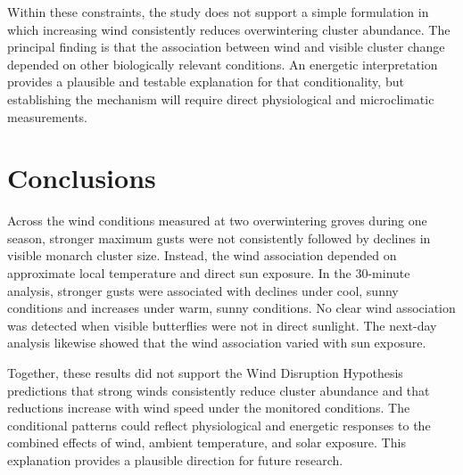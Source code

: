\documentclass[insects,article,submit,pdftex,moreauthors]{Definitions/mdpi}
\begin{document}
Within these constraints, the study does not support a simple formulation in which increasing wind consistently reduces overwintering cluster abundance. The principal finding is that the association between wind and visible cluster change depended on other biologically relevant conditions. An energetic interpretation provides a plausible and testable explanation for that conditionality, but establishing the mechanism will require direct physiological and microclimatic measurements.


\section{Conclusions}

Across the wind conditions measured at two overwintering groves during one season, stronger maximum gusts were not consistently followed by declines in visible monarch cluster size. Instead, the wind association depended on approximate local temperature and direct sun exposure. In the 30-minute analysis, stronger gusts were associated with declines under cool, sunny conditions and increases under warm, sunny conditions. No clear wind association was detected when visible butterflies were not in direct sunlight. The next-day analysis likewise showed that the wind association varied with sun exposure.

Together, these results did not support the Wind Disruption Hypothesis predictions that strong winds consistently reduce cluster abundance and that reductions increase with wind speed under the monitored conditions. The conditional patterns could reflect physiological and energetic responses to the combined effects of wind, ambient temperature, and solar exposure. This explanation provides a plausible direction for future research.



\vspace{6pt}

\end{document}
